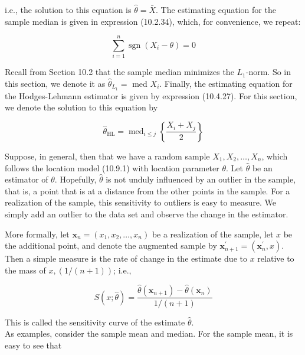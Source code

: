 i.e., the solution to this equation is $\widehat{\theta}=\bar{X}$. The estimating equation for the sample median is given in expression (10.2.34), which, for convenience, we repeat:


\begin{equation*}
\sum_{i=1}^{n} \operatorname{sgn}\left(X_{i}-\theta\right)=0 \tag{10.9.3}
\end{equation*}


Recall from Section 10.2 that the sample median minimizes the $L_{1}$-norm. So in this section, we denote it as $\widehat{\theta}_{L_{1}}=$ med $X_{i}$. Finally, the estimating equation for the Hodges-Lehmann estimator is given by expression (10.4.27). For this section, we denote the solution to this equation by


\begin{equation*}
\widehat{\theta}_{\mathrm{HL}}=\operatorname{med}_{i \leq j}\left\{\frac{X_{i}+X_{j}}{2}\right\} \tag{10.9.4}
\end{equation*}


Suppose, in general, then that we have a random sample $X_{1}, X_{2}, \ldots, X_{n}$, which follows the location model (10.9.1) with location parameter $\theta$. Let $\hat{\theta}$ be an estimator of $\theta$. Hopefully, $\widehat{\theta}$ is not unduly influenced by an outlier in the sample, that is, a point that is at a distance from the other points in the sample. For a realization of the sample, this sensitivity to outliers is easy to measure. We simply add an outlier to the data set and observe the change in the estimator.

More formally, let $\mathbf{x}_{n}=\left(x_{1}, x_{2}, \ldots, x_{n}\right)$ be a realization of the sample, let $x$ be the additional point, and denote the augmented sample by $\mathbf{x}_{n+1}^{\prime}=\left(\mathbf{x}_{n}^{\prime}, x\right)$. Then a simple measure is the rate of change in the estimate due to $x$ relative to the mass of $x,(1 /(n+1))$; i.e.,


\begin{equation*}
S(x ; \widehat{\theta})=\frac{\widehat{\theta}\left(\mathbf{x}_{n+1}\right)-\widehat{\theta}\left(\mathbf{x}_{n}\right)}{1 /(n+1)} \tag{10.9.5}
\end{equation*}


This is called the sensitivity curve of the estimate $\widehat{\theta}$.\\
As examples, consider the sample mean and median. For the sample mean, it is easy to see that


